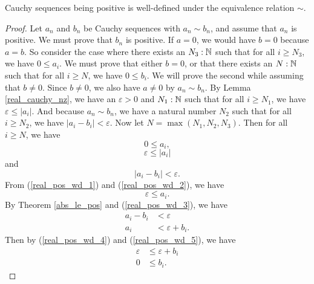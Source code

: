 \documentclass[../../math.tex]{subfiles}
\begin{document}
\begin{lemma}
    Cauchy sequences being positive is well-defined under the equivalence
    relation $\sim$.
\end{lemma}
\begin{proof}
    Let $a_n$ and $b_n$ be Cauchy sequences with $a_n \sim b_n$, and assume that
    $a_n$ is positive.  We must prove that $b_n$ is positive.  If $a = 0$, we
    would have $b = 0$ because $a = b$.  So consider the case where there exists
    an $N_3 : \mathbb{N}$ such that for all $i \geq N_3$, we have $0 \leq a_i$.  We must
    prove that either $b = 0$, or that there exists an $N : \mathbb{N}$ such that for
    all $i \geq N$, we have $0 \leq b_i$.  We will prove the second while
    assuming that $b \neq 0$.  Since $b \neq 0$, we also have $a \neq 0$ by $a_n
    \sim b_n$.  By Lemma \ref{real_cauchy_nz}, we have an $\varepsilon > 0$ and
    $N_1 : \mathbb{N}$ such that for all $i \geq N_1$, we have $\varepsilon \leq |a_i|$.
    And because $a_n \sim b_n$, we have a natural number $N_2$ such that for all
    $i \geq N_2$, we have $|a_i - b_i| < \varepsilon$.  Now let $N = \max(N_1,
    N_2, N_3)$.  Then for all $i \geq N$, we have
    \begin{equation} \label{real_pos_wd_1}
        0 \leq a_i,
    \end{equation}
    \begin{equation} \label{real_pos_wd_2}
        \varepsilon \leq |a_i|
    \end{equation}
    and
    \begin{equation} \label{real_pos_wd_3}
        |a_i - b_i| < \varepsilon.
    \end{equation}
    From (\ref{real_pos_wd_1}) and (\ref{real_pos_wd_2}), we have
    \begin{equation} \label{real_pos_wd_4}
        \varepsilon \leq a_i.
    \end{equation}
    By Theorem \ref{abs_le_pos} and (\ref{real_pos_wd_3}), we have
    \begin{align}
        a_i - b_i &< \varepsilon \nonumber \\
        a_i &< \varepsilon + b_i. \label{real_pos_wd_5}
    \end{align}
    Then by (\ref{real_pos_wd_4}) and (\ref{real_pos_wd_5}), we have
    \begin{align*}
        \varepsilon &\leq \varepsilon + b_i \\
        0 &\leq b_i.
    \end{align*}
\end{proof}
\end{document}
